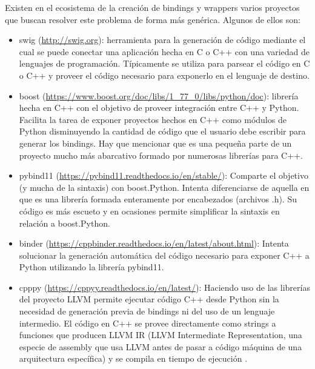 Existen en el ecosistema de la creación de bindings y wrappers varios proyectos
que buscan resolver este problema de forma más genérica. Algunos de ellos son:

\begin{itemize}
    \item swig (\url{http://swig.org}): herramienta para la generación de
    código mediante el cual se puede conectar una aplicación hecha en C o C++
    con una variedad de lenguajes de programación. Típicamente se utiliza para
    parsear el código en C o C++ y proveer el código necesario para exponerlo
    en el lenguaje de destino.

    \item boost
    (\url{https://www.boost.org/doc/libs/1_77_0/libs/python/doc}): librería
    \linebreak
    hecha en C++ con el objetivo de proveer integración entre C++ y
    Python. Facilita la tarea de exponer proyectos hechos en C++ como módulos
    de Python disminuyendo la cantidad de código que el usuario debe escribir
    para generar los bindings. Hay que mencionar que es una pequeña parte de un
    proyecto mucho más abarcativo formado por numerosas librerías para C++.

    \item pybind11 (\url{https://pybind11.readthedocs.io/en/stable/}): Comparte
    el objetivo (y mucha de la sintaxis) con boost.Python.  Intenta
    diferenciarse de aquella en que es una librería formada enteramente por
    encabezados (archivos .h). Su código es más escueto y en ocasiones permite
    simplificar la sintaxis en relación a boost.Python. 

    \item binder (\url{https://cppbinder.readthedocs.io/en/latest/about.html}):
    Intenta solucionar la generación automática del código necesario para
    exponer C++ a Python utilizando la librería pybind11.

    \item cpppy (\url{https://cppyy.readthedocs.io/en/latest/}): Haciendo uso
    de las librerías del proyecto LLVM permite ejecutar código C++ desde Python
    sin la necesidad de generación previa de bindings ni del uso de un lenguaje
    intermedio. El código en C++ se provee directamente como strings a
    funciones que producen LLVM IR (LLVM Intermediate Representation, una
    especie de assembly que usa LLVM antes de pasar a código máquina de una
    arquitectura específica) y se compila en tiempo de ejecución
    \cite{lavrijsen}.
\end{itemize}

